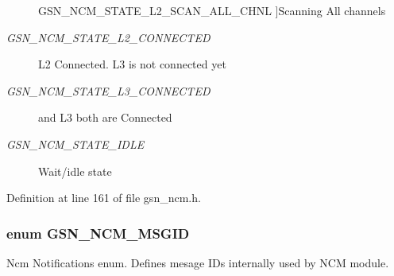 \begin{Desc}
\begin{description}
{{GSN\_\-NCM\_\-STATE\_\-L2\_\-SCAN\_\-ALL\_\-CHNL}
\label{a00688_gga950af3c458482d4fbf1838aaf8b30f2daa3532bd5ed61d5a5535078d948b1022d}
}]Scanning All channels \item[{\em 
\hypertarget{a00688_gga950af3c458482d4fbf1838aaf8b30f2daf9087e99e508fd754ef4e32ca8ab4b3b}{
GSN\_\-NCM\_\-STATE\_\-L2\_\-CONNECTED}
\label{a00688_gga950af3c458482d4fbf1838aaf8b30f2daf9087e99e508fd754ef4e32ca8ab4b3b}
}]L2 Connected. L3 is not connected yet \item[{\em 
\hypertarget{a00688_gga950af3c458482d4fbf1838aaf8b30f2da66eb72fa85fe1d23963fe8daa49d9215}{
GSN\_\-NCM\_\-STATE\_\-L3\_\-CONNECTED}
\label{a00688_gga950af3c458482d4fbf1838aaf8b30f2da66eb72fa85fe1d23963fe8daa49d9215}
}]and L3 both are Connected \item[{\em 
\hypertarget{a00688_gga950af3c458482d4fbf1838aaf8b30f2daed4f9e1b80afb22d823328667e4b8e02}{
GSN\_\-NCM\_\-STATE\_\-IDLE}
\label{a00688_gga950af3c458482d4fbf1838aaf8b30f2daed4f9e1b80afb22d823328667e4b8e02}
}]Wait/idle state \end{description}
\end{Desc}



Definition at line 161 of file gsn\_\-ncm.h.

\hypertarget{a00688_ga7df8ae3172682e89bfa663208e3f0081}{
\subsubsection[{GSN\_\-NCM\_\-MSGID}]{\setlength{\rightskip}{0pt plus 5cm}enum {\bf GSN\_\-NCM\_\-MSGID}}}
\label{a00688_ga7df8ae3172682e89bfa663208e3f0081}


Ncm Notifications enum. Defines mesage IDs internally used by NCM module. 

